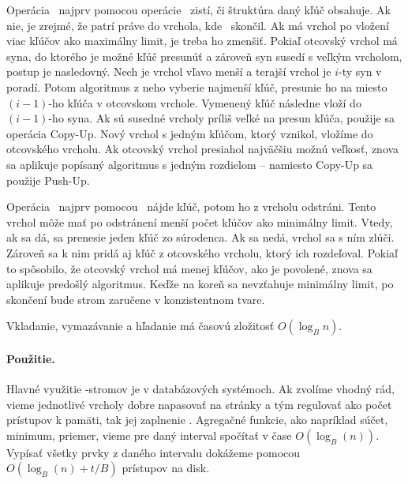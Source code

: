 Operácia \ins\ najprv pomocou operácie \find\ zistí, či štruktúra daný kľúč obsahuje.
Ak nie, je zrejmé, že patrí práve do vrchola, kde \find\ skončil. Ak má vrchol po vložení
viac kľúčov ako maximálny limit, je treba ho zmenšiť. Pokiaľ otcovský vrchol má syna,
do ktorého je možné kľúč presunúť a zároveň syn susedí s veľkým vrcholom, postup je nasledovný.
Nech je vrchol vľavo menší a terajší vrchol je $i$-ty syn v poradí. Potom algoritmus z neho
vyberie najmenší kľúč, presunie ho na miesto $(i-1)$-ho kľúča v otcovskom vrchole. Vymenený
kľúč následne vloží do $(i-1)$-ho syna. Ak sú susedné vrcholy príliš veľké na presun kľúča,
použije sa operácia {\sc Copy-Up}. Nový vrchol s jedným kľúčom, ktorý vznikol, vložíme do
otcovského vrcholu. Ak otcovský vrchol presiahol najväčšiu možnú veľkosť, znova sa aplikuje
popísaný algoritmus s jedným rozdielom -- namiesto {\sc Copy-Up} sa použije {\sc Push-Up}.

Operácia \delete\ najprv pomocou \find\ nájde kľúč, potom ho z vrcholu odstráni. Tento vrchol
môže mať po odstránení menší počet kľúčov ako minimálny limit. Vtedy, ak sa dá, sa prenesie
jeden kľúč zo súrodenca. Ak sa nedá, vrchol sa s ním zlúči. Zároveň sa k nim pridá aj kľúč
z otcovského vrcholu, ktorý ich rozdeľoval. Pokiaľ to spôsobilo, že otcovský vrchol má menej
kľúčov, ako je povolené, znova sa aplikuje predošlý algoritmus. Keďže na koreň sa nevzťahuje
minimálny limit, po skončení bude strom zaručene v konzistentnom tvare.

Vkladanie, vymazávanie a hľadanie má časovú zložitosť $O(\log_B n)$.

\paragraph{Použitie.}
Hlavné využitie \Bp-stromov je v databázových systémoch. Ak zvolíme vhodný rád, vieme jednotlivé
vrcholy dobre napasovať na stránky a tým regulovať ako počet prístupov k pamäti, tak jej zaplnenie
\citep{sahni}. Agregačné funkcie, ako napríklad súčet, minimum, priemer, vieme pre daný interval
spočítať v čase $O(\log_B(n))$. Vypísať všetky prvky z daného intervalu dokážeme pomocou
$O(\log_B(n) + t/B)$ prístupov na disk.


